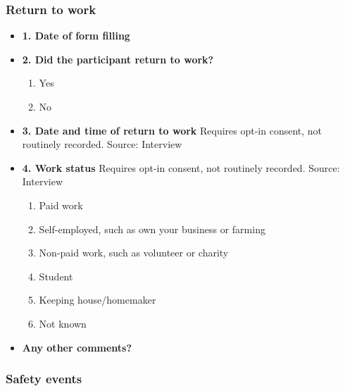 \documentclass[
]{scrartcl}
\providecommand{\tightlist}{%
  \setlength{\itemsep}{0pt}\setlength{\parskip}{0pt}}\usepackage{longtable,booktabs,array}
\begin{document}
\hypertarget{return-to-work}{%
\subsubsection{Return to work}\label{return-to-work}}

\begin{itemize}
\item
  \textbf{1. Date of form filling}
\item
  \textbf{2. Did the participant return to work?}

  \begin{enumerate}
  \def\labelenumi{\arabic{enumi}.}
  \tightlist
  \item
    Yes
  \item
    No
  \end{enumerate}
\item
  \textbf{3. Date and time of return to work} Requires opt-in consent,
  not routinely recorded. Source: Interview
\item
  \textbf{4. Work status} Requires opt-in consent, not routinely
  recorded. Source: Interview

  \begin{enumerate}
  \def\labelenumi{\arabic{enumi}.}
  \tightlist
  \item
    Paid work
  \item
    Self-employed, such as own your business or farming
  \item
    Non-paid work, such as volunteer or charity
  \item
    Student
  \item
    Keeping house/homemaker
  \item
    Not known
  \end{enumerate}
\item
  \textbf{Any other comments?}
\end{itemize}

\hypertarget{safety-events}{%
\subsubsection{Safety events}\label{safety-events}}
\end{document}
